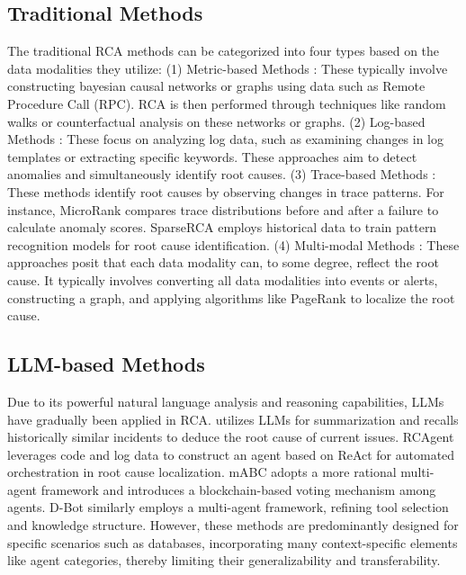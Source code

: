 \subsection{Traditional Methods}

The traditional RCA methods can be categorized into four types based on the data modalities they utilize: (1) Metric-based Methods \citep{metric1,metric2,metric3,metric4}: These typically involve constructing bayesian causal networks or graphs using data such as Remote Procedure Call (RPC). RCA is then performed through techniques like random walks or counterfactual analysis on these networks or graphs. (2) Log-based Methods \citep{log1,log2}: These focus on analyzing log data, such as examining changes in log templates or extracting specific keywords. These approaches aim to detect anomalies and simultaneously identify root causes. (3) Trace-based Methods \citep{yu2021microrank,trace2}: These methods identify root causes by observing changes in trace patterns. For instance, MicroRank \citep{yu2021microrank} compares trace distributions before and after a failure to calculate anomaly scores. SparseRCA \citep{yaosparserca} employs historical data to train pattern recognition models for root cause identification. (4) Multi-modal Methods \citep{yao2024chain,yu2023nezha}: These approaches posit that each data modality can, to some degree, reflect the root cause. It typically involves converting all data modalities into events or alerts, constructing a graph, and applying algorithms like PageRank \citep{page1999pagerank} to localize the root cause.


\subsection{LLM-based Methods}

Due to its powerful natural language analysis and reasoning capabilities, LLMs have gradually been applied in RCA. \citet{chen2024automatic} utilizes LLMs for summarization and recalls historically similar incidents to deduce the root cause of current issues. RCAgent \citep{wang2023rcagent} leverages code and log data to construct an agent based on ReAct for automated orchestration in root cause localization. mABC \citep{zhang2024mabc} adopts a more rational multi-agent framework and introduces a blockchain-based voting mechanism among agents. D-Bot \citep{zhou2024d-bot} similarly employs a multi-agent framework, refining tool selection and knowledge structure. However, these methods are predominantly designed for specific scenarios such as databases, incorporating many context-specific elements like agent categories, thereby limiting their generalizability and transferability.